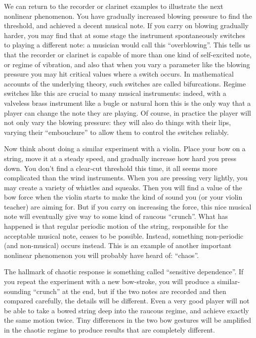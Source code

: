   We can return to the recorder or clarinet examples to illustrate the next 
  nonlinear phenomenon. You have gradually increased blowing pressure to find 
  the threshold, and achieved a decent musical note. If you carry on blowing 
  gradually harder, you may find that at some stage the instrument 
  spontaneously switches to playing a different note: a musician would call 
  this “overblowing”. This tells us that the recorder or clarinet is capable of 
  more than one kind of self-excited note, or regime of vibration, and also 
  that when you vary a parameter like the blowing pressure you may hit critical 
  values where a switch occurs. In mathematical accounts of the underlying 
  theory, such switches are called bifurcations. Regime switches like this are 
  crucial to many musical instruments: indeed, with a valveless brass 
  instrument like a bugle or natural horn this is the only way that a player 
  can change the note they are playing. Of course, in practice the player will 
  not only vary the blowing pressure: they will also do things with their lips, 
  varying their “embouchure” to allow them to control the switches reliably. 

  Now think about doing a similar experiment with a violin. Place your bow on a 
  string, move it at a steady speed, and gradually increase how hard you press 
  down. You don't find a clear-cut threshold this time, it all seems more 
  complicated than the wind instruments. When you are pressing very lightly, 
  you may create a variety of whistles and squeaks. Then you will find a value 
  of the bow force when the violin starts to make the kind of sound you (or 
  your violin teacher) are aiming for. But if you carry on increasing the 
  force, this nice musical note will eventually give way to some kind of 
  raucous “crunch”. What has happened is that regular periodic motion of the 
  string, responsible for the acceptable musical note, ceases to be possible. 
  Instead, something non-periodic (and non-musical) occurs instead. This is an 
  example of another important nonlinear phenomenon you will probably have 
  heard of: “chaos”. 

  The hallmark of chaotic response is something called “sensitive dependence”. 
  If you repeat the experiment with a new bow-stroke, you will produce a 
  similar-sounding “crunch” at the end, but if the two notes are recorded and 
  then compared carefully, the details will be different. Even a very good 
  player will not be able to take a bowed string deep into the raucous regime, 
  and achieve exactly the same motion twice. Tiny differences in the two bow 
  gestures will be amplified in the chaotic regime to produce results that are 
  completely different. 

